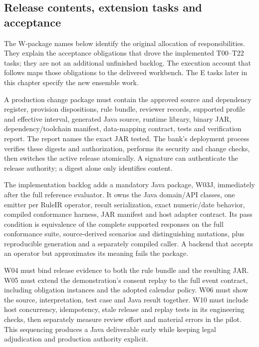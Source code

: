\subsection{Release contents, extension tasks and acceptance}

The W-package names below identify the original allocation of responsibilities.
They explain the acceptance obligations that drove the implemented T00--T22
tasks; they are not an additional unfinished backlog. The execution account that
follows maps those obligations to the delivered workbench. The E tasks later in
this chapter specify the new ensemble work.


\label{merge:P-03d-java-delivery:06}


A production change package must contain the approved source and dependency
register, provision dispositions, rule bundle, reviewer records, supported
profile and effective interval, generated Java source, runtime library, binary
JAR, dependency/toolchain manifest, data-mapping contract, tests and verification
report. The report names the exact JAR tested. The bank's deployment process
verifies these digests and authorization, performs its security and change checks,
then switches the active release atomically. A signature can authenticate the
release authority; a digest alone only identifies content.


The implementation backlog adds a mandatory Java package, W03J, immediately
after the full reference evaluator. It owns the Java domain/API classes, one
emitter per RuleIR operator, result serialization, exact numeric/date behavior,
compiled conformance harness, JAR manifest and host adapter contract. Its pass
condition is equivalence of the complete supported responses on the full
conformance suite, source-derived scenarios and distinguishing mutations,
plus reproducible generation and a separately compiled caller. A backend that
accepts an operator but approximates its meaning fails the package.

W04 must bind release evidence to both the rule bundle and the resulting JAR.
W05 must extend the demonstration's consent replay to the full event contract,
including obligation instances and the adopted calendar policy. W06 must show
the source, interpretation, test case and Java result together. W10 must include
host concurrency, idempotency, stale release and replay tests in its engineering
checks, then separately measure review effort and material errors in the pilot.
This sequencing produces a Java deliverable early while keeping legal
adjudication and production authority explicit.

